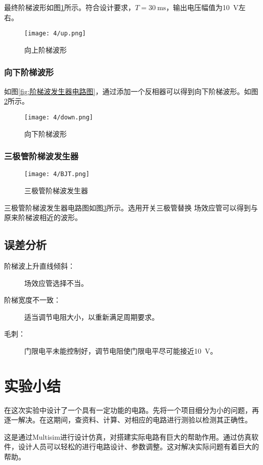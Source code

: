 最终阶梯波形如图\ref{fig:向上阶梯波形}所示。符合设计要求，$ T = \SI{30}{\ms} $，输出电压幅值为\SI{10}{\V}左右。

\begin{figure}[H]
	\centering
	\texttt{[image: 4/up.png]}
	\caption{向上阶梯波形}
	\label{fig:向上阶梯波形}
\end{figure}

\subsubsection{向下阶梯波形}%
\label{ssub:向下阶梯波形}

如图\ref{fig:阶梯波发生器电路图}，通过添加一个反相器可以得到向下阶梯波形。如图\ref{fig:向下阶梯波形}所示。

\begin{figure}[H]
	\centering
	\texttt{[image: 4/down.png]}
	\caption{向下阶梯波形}
	\label{fig:向下阶梯波形}
\end{figure}

\subsubsection{三极管阶梯波发生器}%
\label{ssub:三极管阶梯波发生器}

\begin{figure}[H]
	\centering
	\texttt{[image: 4/BJT.png]}
	\caption{三极管阶梯波发生器}
	\label{fig:三极管阶梯波发生器}
\end{figure}

三极管阶梯波发生器电路图如图\ref{fig:三极管阶梯波发生器}所示。选用开关三极管替换
场效应管可以得到与原来阶梯波相近的波形。

\subsection{误差分析}%
\label{sub:\arabic{chapter}误差分析}

\begin{description}
	\item[阶梯波上升直线倾斜：]场效应管选择不当。
	\item[阶梯宽度不一致：]适当调节电阻大小，以重新满足周期要求。
	\item[毛刺：]门限电平未能控制好，调节电阻使门限电平尽可能接近\SI{10}{\V}。
\end{description}

\section{实验小结}%
\label{sec:\arabic{chapter}实验小结}

在这次实验中设计了一个具有一定功能的电路。先将一个项目细分为小的问题，再逐一解决。在这期间，查资料、计算、对相应的电路进行测验以检测其正确性。

这是通过Multisim进行设计仿真，对搭建实际电路有巨大的帮助作用。通过仿真软件，设计人员可以轻松的进行电路设计、参数调整。这对解决实际问题有着巨大的帮助。

